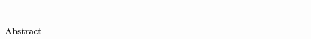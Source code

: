 \begin{vcentrepage}
\noindent\rule[2pt]{\textwidth}{0.2pt}\\

{\center\large\textbf{Abstract}\\}
\doublespacing

    \lipsum[1-2]


\noindent
\end{vcentrepage}

